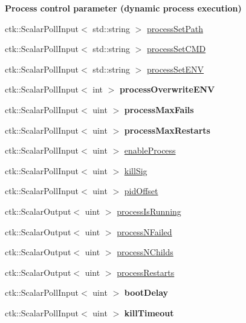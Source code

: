 \begin{Indent}{\bf Process control parameter (dynamic process execution)}\par
\begin{DoxyCompactItemize}
\item 
ctk\+::\+Scalar\+Poll\+Input$<$ std\+::string $>$ \hyperlink{structProcessControlModule_a2f3edf4b64217d9242034e876b74271e}{process\+Set\+Path}
\item 
ctk\+::\+Scalar\+Poll\+Input$<$ std\+::string $>$ \hyperlink{structProcessControlModule_a0f8c1a2b80ca32287fa60af12da681f7}{process\+Set\+C\+MD}
\item 
ctk\+::\+Scalar\+Poll\+Input$<$ std\+::string $>$ \hyperlink{structProcessControlModule_a95ed5208eb6265f71be5c96fa9b1bfd6}{process\+Set\+E\+NV}
\item 
ctk\+::\+Scalar\+Poll\+Input$<$ int $>$ {\bfseries process\+Overwrite\+E\+NV}
\item 
ctk\+::\+Scalar\+Poll\+Input$<$ uint $>$ {\bfseries process\+Max\+Fails}
\item 
ctk\+::\+Scalar\+Poll\+Input$<$ uint $>$ {\bfseries process\+Max\+Restarts}
\item 
ctk\+::\+Scalar\+Poll\+Input$<$ uint $>$ \hyperlink{structProcessControlModule_a0e5511753b568a4fde7d00caa1575299}{enable\+Process}
\item 
ctk\+::\+Scalar\+Poll\+Input$<$ uint $>$ \hyperlink{structProcessControlModule_a47ea8ec5bf7aa3914bb61f12c6aefe59}{kill\+Sig}
\item 
ctk\+::\+Scalar\+Poll\+Input$<$ uint $>$ \hyperlink{structProcessControlModule_a9a3ef4d12ac2b4794154ed091b655796}{pid\+Offset}
\item 
ctk\+::\+Scalar\+Output$<$ uint $>$ \hyperlink{structProcessControlModule_a63ba3083112290dc80113c7d0c29f6f9}{process\+Is\+Running}
\item 
ctk\+::\+Scalar\+Output$<$ uint $>$ \hyperlink{structProcessControlModule_a14a9aee3312baf85c8999c778b169039}{process\+N\+Failed}
\item 
ctk\+::\+Scalar\+Output$<$ uint $>$ \hyperlink{structProcessControlModule_ad5ec578c8e25d6117e9c45de024319bc}{process\+N\+Childs}
\item 
ctk\+::\+Scalar\+Output$<$ uint $>$ \hyperlink{structProcessControlModule_a52d785e727ec341c125e18c433f9fbe0}{process\+Restarts}
\item 
ctk\+::\+Scalar\+Poll\+Input$<$ uint $>$ {\bfseries boot\+Delay}
\item 
ctk\+::\+Scalar\+Poll\+Input$<$ uint $>$ {\bfseries kill\+Timeout}
\end{DoxyCompactItemize}
\end{Indent}


